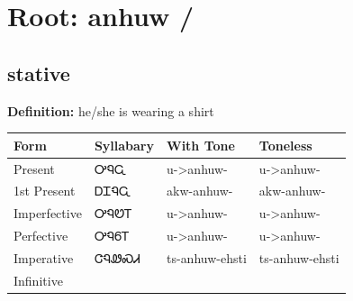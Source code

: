 \documentclass{article}%
\begin{document}
%
\normalsize%
\section*{Root: anhuw / }%
\subsection*{stative}%
\textbf{Definition: }%
he/she is wearing a shirt%
\\[0.5em]%
\begin{tabular}{|l|l|l|l|}%
\hline%
\textbf{Form}&\textbf{Syllabary}&\textbf{With Tone}&\textbf{Toneless}\\%
\hline%
Present&ᎤᏄᏩ&u{-}>anhuw{-}&u{-}>anhuw{-}\\%
1st Present&ᎠᏆᏄᏩ&akw{-}anhuw{-}&akw{-}anhuw{-}\\%
Imperfective&ᎤᏄᏬᎢ&u{-}>anhuw{-}&u{-}>anhuw{-}\\%
Perfective&ᎤᏄᏮᎢ&u{-}>anhuw{-}&u{-}>anhuw{-}\\%
Imperative&ᏣᏄᏪᏍᏗ&ts{-}anhuw{-}ehsti&ts{-}anhuw{-}ehsti\\%
Infinitive&&&\\%
\hline%
\end{tabular}%
\\[1em]%
\end{document}
